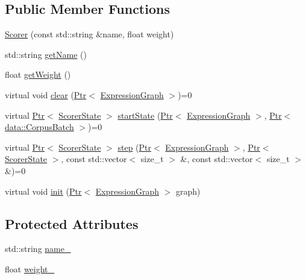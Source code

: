 \subsection*{Public Member Functions}
\begin{DoxyCompactItemize}
\item 
\hyperlink{classmarian_1_1Scorer_a70f41d372a9989811cd83852f3283c32}{Scorer} (const std\+::string \&name, float weight)
\item 
std\+::string \hyperlink{classmarian_1_1Scorer_a0ad62a34381151462c960b1e731563bf}{get\+Name} ()
\item 
float \hyperlink{classmarian_1_1Scorer_af4fc7bb72abdd1a19a9d22a6202a41cd}{get\+Weight} ()
\item 
virtual void \hyperlink{classmarian_1_1Scorer_a303fd84dab071186dee77891c8351e55}{clear} (\hyperlink{namespacemarian_ad1a373be43a00ef9ce35666145137b08}{Ptr}$<$ \hyperlink{classmarian_1_1ExpressionGraph}{Expression\+Graph} $>$)=0
\item 
virtual \hyperlink{namespacemarian_ad1a373be43a00ef9ce35666145137b08}{Ptr}$<$ \hyperlink{classmarian_1_1ScorerState}{Scorer\+State} $>$ \hyperlink{classmarian_1_1Scorer_aaefbe7744d015a273344eea6729b0bed}{start\+State} (\hyperlink{namespacemarian_ad1a373be43a00ef9ce35666145137b08}{Ptr}$<$ \hyperlink{classmarian_1_1ExpressionGraph}{Expression\+Graph} $>$, \hyperlink{namespacemarian_ad1a373be43a00ef9ce35666145137b08}{Ptr}$<$ \hyperlink{classmarian_1_1data_1_1CorpusBatch}{data\+::\+Corpus\+Batch} $>$)=0
\item 
virtual \hyperlink{namespacemarian_ad1a373be43a00ef9ce35666145137b08}{Ptr}$<$ \hyperlink{classmarian_1_1ScorerState}{Scorer\+State} $>$ \hyperlink{classmarian_1_1Scorer_a377f003fbab702227d0aa895af54a94a}{step} (\hyperlink{namespacemarian_ad1a373be43a00ef9ce35666145137b08}{Ptr}$<$ \hyperlink{classmarian_1_1ExpressionGraph}{Expression\+Graph} $>$, \hyperlink{namespacemarian_ad1a373be43a00ef9ce35666145137b08}{Ptr}$<$ \hyperlink{classmarian_1_1ScorerState}{Scorer\+State} $>$, const std\+::vector$<$ size\+\_\+t $>$ \&, const std\+::vector$<$ size\+\_\+t $>$ \&)=0
\item 
virtual void \hyperlink{classmarian_1_1Scorer_a5146708323940573726fda431f3baa51}{init} (\hyperlink{namespacemarian_ad1a373be43a00ef9ce35666145137b08}{Ptr}$<$ \hyperlink{classmarian_1_1ExpressionGraph}{Expression\+Graph} $>$ graph)
\end{DoxyCompactItemize}
\subsection*{Protected Attributes}
\begin{DoxyCompactItemize}
\item 
std\+::string \hyperlink{classmarian_1_1Scorer_ae335e429e353988826978741f41e3c3b}{name\+\_\+}
\item 
float \hyperlink{classmarian_1_1Scorer_aa46033c062f31ba15b16066b63d83a39}{weight\+\_\+}
\end{DoxyCompactItemize}


